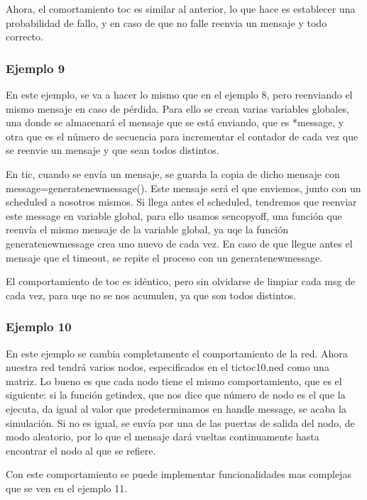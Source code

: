 \documentclass{article}
\begin{document}
		Ahora, el comortamiento toc es similar al anterior, lo que hace es establecer una probabilidad de fallo, y en caso de que no falle reenvia un mensaje y todo correcto.
		
		\subsubsection{Ejemplo 9}
		
		En este ejemplo, se va a hacer lo mismo que en el ejemplo 8, pero reenviando el mismo mensaje en caso de pérdida. Para ello se crean varias variables globales, una donde se almacenará el mensaje que se está enviando, que es *message, y otra que es el número de secuencia para incrementar el contador de cada vez que se reenvie un mensaje y que sean todos distintos.
		
		En tic, cuando se envía un mensaje, se guarda la copia de dicho mensaje con message=generatenewmessage(). Este mensaje será el que enviemos, junto con un scheduled a nosotros mismos. Si llega antes el scheduled, tendremos que reenviar este message en variable global, para ello usamos sencopyoff, una función que reenvía el mismo mensaje de la variable global, ya uqe la función generatenewmessage crea uno nuevo de cada vez. En caso de que llegue antes el mensaje que el timeout, se repite el proceso con un generatenewmessage.
		
		El comportamiento de toc es idéntico, pero sin olvidarse de limpiar cada msg de cada vez, para uqe no se nos acumulen, ya que son todos distintos.
		
		\subsubsection{Ejemplo 10}
		
		En este ejemplo se cambia completamente el comportamiento de la red. Ahora nuestra red tendrá varios nodos, especificados en el tictoc10.ned como una matriz. Lo bueno es que cada nodo tiene el mismo comportamiento, que es el siguiente: si la función getindex, que nos dice que número de nodo es el que la ejecuta, da igual al valor que predeterminamos en handle message, se acaba la simulación. Si no es igual, se envía por una de las puertas de salida del nodo, de modo aleatorio, por lo que el mensaje dará vueltas continuamente hasta encontrar el nodo al que se refiere.
		
		Con este comportamiento se puede implementar funcionalidades mas complejas que se ven en el ejemplo 11.
		
\end{document}
